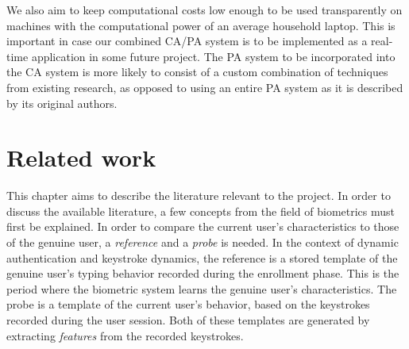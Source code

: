 \documentclass[informationsecurity]{gucmasterproject}
\begin{document}
We also aim to keep computational costs low enough to be used transparently on machines with the computational power of an average household laptop.
This is important in case our combined CA/PA system is to be implemented as a real-time application in some future project.
The PA system to be incorporated into the CA system is more likely to consist of a custom combination of techniques from existing research, as opposed to using an entire PA system as it is described by its original authors.
%

\chapter{Related work}
\label{chap:related}
This chapter aims to describe the literature relevant to the project.
In order to discuss the available literature, a few concepts from the field of biometrics must first be explained.
In order to compare the current user's characteristics to those of the genuine user, a \textit{reference} and a \textit{probe} is needed.
In the context of dynamic authentication and keystroke dynamics, the reference is a stored template of the genuine user's typing behavior recorded during the enrollment phase. 
This is the period where the biometric system learns the genuine user's characteristics.
The probe is a template of the current user's behavior, based on the keystrokes recorded during the user session.
Both of these templates are generated by extracting \textit{features} from the recorded keystrokes.
\end{document}

